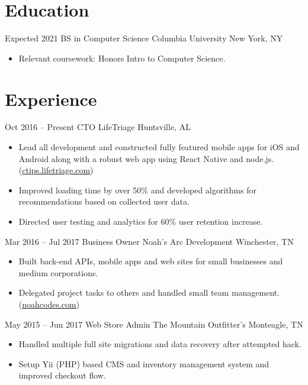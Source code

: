\documentclass[letterpaper]{moderncv}        %
\begin{document}
\makecvtitle
\section{Education}
\cventry
{Expected 2021}
{BS in Computer Science}
{Columbia University}
{New York, NY}
{}
{\begin{itemize}%
	\item Relevant coursework: Honors Intro to Computer Science.
	\end{itemize}}
\section{Experience}
\cventry
{Oct 2016 -- Present}
{CTO}
{LifeTriage}
{Huntsville, AL}
{}
{\begin{itemize}%
	\item Lead all development and constructed fully featured mobile apps for iOS and Android along with a robust web app using React Native and node.js. (\href{https://ctips.lifetriage.com}{ctips.lifetriage.com})
	\item Improved loading time by over 50\% and developed algorithms for recommendations based on collected user data.
	\item Directed user testing and analytics for 60\% user retention increase.
	\end{itemize}}
\cventry
{Mar 2016 -- Jul 2017}
{Business Owner}
{Noah's Arc Development}
{Winchester, TN}
{}
{\begin{itemize}%
	\item  Built back-end APIs, mobile apps and web sites for small businesses and medium corporations.
	\item  Delegated project tasks to others and handled small team management. (\href{https://noahcodes.com/}{noahcodes.com})
	\end{itemize}}
\cventry
{May 2015 -- Jun 2017}
{Web Store Admin}
{The Mountain Outfitter's}
{Monteagle, TN}
{}
{\begin{itemize}%
	\item  Handled multiple full site migrations and data recovery after attempted hack.
	\item  Setup Yii (PHP) based CMS and inventory management system and improved checkout flow.
	\end{itemize}}
\end{document}
